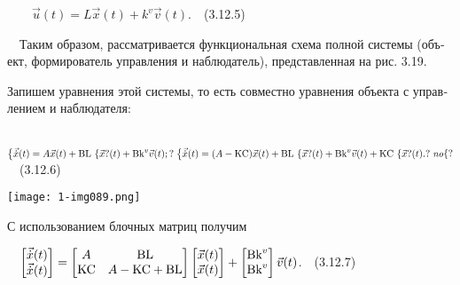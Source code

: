\documentclass[a4paper]{article}
\newcommand\normalsubformula[1]{\text{\mathversion{normal}$#1$}}
\begin{document}
{\begin{russian}\sffamily
\ \ \ \  $\vec u(t)=L\vec x(t)+k^v\vec v(t)$.\ \ (3.12.5)
\end{russian}}

{\begin{russian}\sffamily
\ \ Таким образом, рассматривается функциональная схема полной системы (объект, формирователь управления и наблюдатель),
представленная на рис. 3.19.
\end{russian}}

{\begin{russian}\sffamily
Запишем уравнения этой системы, то есть совместно уравнения объекта с управлением и наблюдателя: 
\end{russian}}

{\begin{russian}\sffamily
\ \  $\begin{matrix}\left\{\vec{\dot x}(t)=A\vec x(t)+\normalsubformula{\text{BL \{}}\vec{\normalsubformula
x}?(t)+\normalsubformula{\text{Bk}}^v\vec v(t);?\right.\left\{\vec{\dot x}(t)=(A-\normalsubformula{\text{KC}})\vec
x(t)+\normalsubformula{\text{BL \{}}\vec{\normalsubformula x}?(t)+\normalsubformula{\text{Bk}}^v\vec
v(t)+\normalsubformula{\text{KC \{}}\vec{\normalsubformula x}?(t).?\right.\mathit{no}\hfill\null
\end{matrix}\{?$\ \ (3.12.6)
\end{russian}}


\bigskip

{\centering  \texttt{[image: 1-img089.png]} \par}
{\begin{russian}\sffamily
С использованием блочных матриц получим
\end{russian}}

{\begin{russian}\sffamily
\ \  $\left[\begin{matrix}\vec{\dot x}(t)\\\vec{\dot
x}(t)\end{matrix}\right]=\left[\begin{matrix}A&\normalsubformula{\text{BL}}\\\normalsubformula{\text{KC}}&A-\normalsubformula{\text{KC}}+\normalsubformula{\text{BL}}\end{matrix}\right]\left[\begin{matrix}\vec
x(t)\\\vec
x(t)\end{matrix}\right]+\left[\begin{matrix}\normalsubformula{\text{Bk}}^v\\\normalsubformula{\text{Bk}}^v\end{matrix}\right]\vec
v(t)$.\ \ (3.12.7)
\end{russian}}
\end{document}
